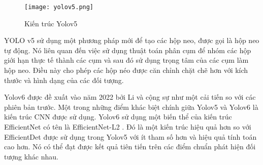 \documentclass[../the.tex]{subfiles}
\begin{document}
{\fontsize{13}{12} \selectfont 
\begin{figure}[H]
	\centering
	\texttt{[image: yolov5.png]}
	\caption{Kiến trúc Yolov5 \cite{s22020464}}
	\label{fig:yolov5}
\end{figure}
\bigskip

YOLO v5 sử dụng một phương pháp mới để tạo các hộp neo, được gọi là hộp neo tự động. 
Nó liên quan đến việc sử dụng thuật toán phân cụm để nhóm các hộp giới hạn thực tế thành các cụm và sau đó sử dụng trọng tâm của các cụm làm hộp neo. 
Điều này cho phép các hộp néo được căn chỉnh chặt chẽ hơn với kích thước và hình dạng của các đối tượng.

Yolov6 \cite{li2022yolov6} được đề xuất vào năm 2022 bởi Li và cộng sự như một cải tiến so với các phiên bản trước. 
Một trong những điểm khác biệt chính giữa Yolov5 và Yolov6 là kiến trúc CNN được sử dụng. 
Yolov6 sử dụng một biến thể của kiến trúc EfficientNet có tên là EfficientNet-L2 \cite{yolov72023}.
Đó là một kiến trúc hiệu quả hơn so với EfficientDet được sử dụng trong Yolov5 với ít tham số hơn và hiệu quả tính toán cao hơn. Nó có thể đạt được kết quả tiên tiến trên các điểm chuẩn phát hiện đối tượng khác nhau.
}
\end{document}
